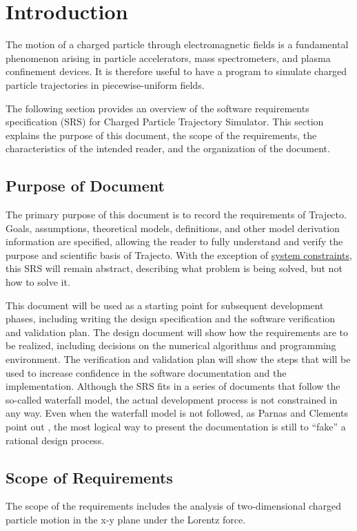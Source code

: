 \documentclass[12pt]{article}
\begin{document}
\section{Introduction}
\label{Sec:Intro}
The motion of a charged particle through electromagnetic fields is a fundamental phenomenon arising in particle accelerators, mass spectrometers, and plasma confinement devices. It is therefore useful to have a program to simulate charged particle trajectories in piecewise-uniform fields.

The following section provides an overview of the software requirements specification (SRS) for Charged Particle Trajectory Simulator. This section explains the purpose of this document, the scope of the requirements, the characteristics of the intended reader, and the organization of the document.

\subsection{Purpose of Document}
\label{Sec:DocPurpose}
The primary purpose of this document is to record the requirements of Trajecto. Goals, assumptions, theoretical models, definitions, and other model derivation information are specified, allowing the reader to fully understand and verify the purpose and scientific basis of Trajecto. With the exception of \hyperref[Sec:SysConstraints]{system constraints}, this SRS will remain abstract, describing what problem is being solved, but not how to solve it.

This document will be used as a starting point for subsequent development phases, including writing the design specification and the software verification and validation plan. The design document will show how the requirements are to be realized, including decisions on the numerical algorithms and programming environment. The verification and validation plan will show the steps that will be used to increase confidence in the software documentation and the implementation. Although the SRS fits in a series of documents that follow the so-called waterfall model, the actual development process is not constrained in any way. Even when the waterfall model is not followed, as Parnas and Clements point out \cite{parnasClements1986}, the most logical way to present the documentation is still to ``fake'' a rational design process.

\subsection{Scope of Requirements}
\label{Sec:ReqsScope}
The scope of the requirements includes the analysis of two-dimensional charged particle motion in the x-y plane under the Lorentz force.
\end{document}
